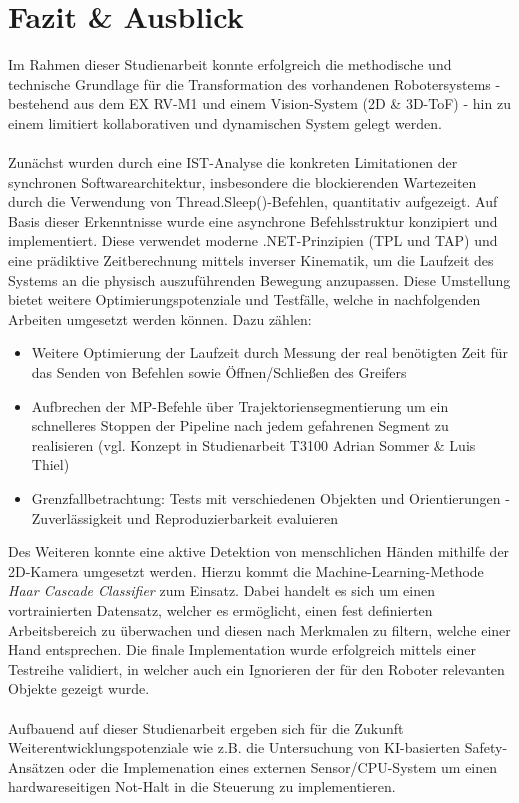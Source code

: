 \chapter{Fazit \& Ausblick}
\label{kap:Fazit und Ausblick}
Im Rahmen dieser Studienarbeit konnte erfolgreich die methodische und technische Grundlage für die Transformation des vorhandenen Robotersystems - bestehend aus dem EX RV-M1 und einem Vision-System (2D \& 3D-ToF) - hin zu einem limitiert kollaborativen und dynamischen System gelegt werden.
\\
\\Zunächst wurden durch eine IST-Analyse die konkreten Limitationen der synchronen Softwarearchitektur, insbesondere die blockierenden Wartezeiten durch die Verwendung von Thread.Sleep()-Befehlen, quantitativ aufgezeigt. Auf Basis dieser Erkenntnisse wurde eine asynchrone Befehlsstruktur konzipiert und implementiert. Diese verwendet moderne .NET-Prinzipien (TPL und TAP) und eine prädiktive Zeitberechnung mittels inverser Kinematik, um die Laufzeit des Systems an die physisch auszuführenden Bewegung anzupassen. Diese Umstellung bietet weitere Optimierungspotenziale und Testfälle, welche in nachfolgenden Arbeiten umgesetzt werden können. Dazu zählen:
\begin{itemize}
	\item Weitere Optimierung der Laufzeit durch Messung der real benötigten Zeit für das Senden von Befehlen sowie Öffnen/Schließen des Greifers
	\item Aufbrechen der MP-Befehle über Trajektoriensegmentierung um ein schnelleres Stoppen der Pipeline nach jedem gefahrenen Segment zu realisieren (vgl. Konzept in Studienarbeit T3100 Adrian Sommer \& Luis Thiel)
	\item Grenzfallbetrachtung: Tests mit verschiedenen Objekten und Orientierungen - Zuverlässigkeit und Reproduzierbarkeit evaluieren
\end{itemize}
Des Weiteren konnte eine aktive Detektion von menschlichen Händen mithilfe der 2D-Kamera umgesetzt werden. Hierzu kommt die Machine-Learning-Methode \textit{Haar Cascade Classifier} zum Einsatz. Dabei handelt es sich um einen vortrainierten Datensatz, welcher es ermöglicht, einen fest definierten Arbeitsbereich zu überwachen und diesen nach Merkmalen zu filtern, welche einer Hand entsprechen. Die finale Implementation wurde erfolgreich mittels einer Testreihe validiert, in welcher auch ein Ignorieren der für den Roboter relevanten Objekte gezeigt wurde.\\
\\Aufbauend auf dieser Studienarbeit ergeben sich für die Zukunft Weiterentwicklungspotenziale wie z.B. die Untersuchung von KI-basierten Safety-Ansätzen oder die Implemenation eines externen Sensor/CPU-System um einen hardwareseitigen Not-Halt in die Steuerung zu implementieren.
